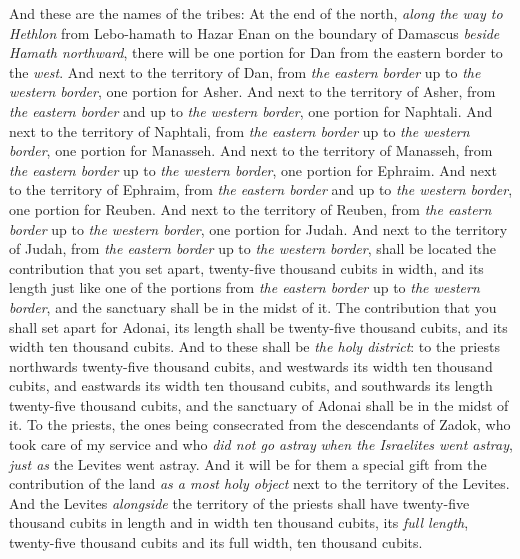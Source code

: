\begin{biblechapter} %
 And these are the names of the tribes: At the end of the north, \textit{along the way to Hethlon} from Lebo-hamath to Hazar Enan on the boundary of Damascus \textit{beside Hamath northward}, there will be one portion for Dan from the eastern border to the \textit{west}.
\verse And next to the territory of Dan, from \textit{the eastern border} up to \textit{the western border}, one portion for Asher.
\verse And next to the territory of Asher, from \textit{the eastern border} and up to \textit{the western border}, one portion for Naphtali.
\verse And next to the territory of Naphtali, from \textit{the eastern border} up to \textit{the western border}, one portion for Manasseh.
\verse And next to the territory of Manasseh, from \textit{the eastern border} up to \textit{the western border}, one portion for Ephraim.
\verse And next to the territory of Ephraim, from \textit{the eastern border} and up to \textit{the western border}, one portion for Reuben.
\verse And next to the territory of Reuben, from \textit{the eastern border} up to \textit{the western border}, one portion for Judah.
\verse And next to the territory of Judah, from \textit{the eastern border} up to \textit{the western border}, shall be located the contribution that you set apart, twenty-five thousand cubits in width, and its length just like one of the portions from \textit{the eastern border} up to \textit{the western border}, and the sanctuary shall be in the midst of it.
\verse The contribution that you shall set apart for Adonai, its length shall be twenty-five thousand cubits, and its width ten thousand cubits.
\verse And to these shall be \textit{the holy district}: to the priests northwards twenty-five thousand cubits, and westwards its width ten thousand cubits, and eastwards its width ten thousand cubits, and southwards its length twenty-five thousand cubits, and the sanctuary of Adonai shall be in the midst of it.
\verse To the priests, the ones being consecrated from the descendants of Zadok, who took care of my service and who \textit{did not go astray} \textit{when the Israelites went astray}, \textit{just as} the Levites went astray.
\verse And it will be for them a special gift from the contribution of the land \textit{as a most holy object} next to the territory of the Levites.
\verse And the Levites \textit{alongside} the territory of the priests shall have twenty-five thousand cubits in length and in width ten thousand cubits, its \textit{full length}, twenty-five thousand cubits and its full width, ten thousand cubits.

\end{biblechapter}

